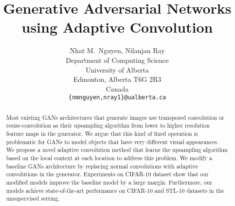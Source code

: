 \documentclass{article} %
\title{Generative Adversarial Networks using Adaptive Convolution}
\author{Nhat M.~Nguyen, Nilanjan Ray \\
Department of Computing Science\\
University of Alberta\\
Edmonton, Alberta T6G 2R3 \\
Canada \\
\texttt{\{nmnguyen,nray1\}@ualberta.ca}
}
\begin{document}
\maketitle

\begin{abstract}
Most existing GANs architectures that generate images use transposed convolution or resize-convolution as their upsampling algorithm from lower to higher resolution feature maps in the generator. We argue that this kind of fixed operation is problematic for GANs to model objects that have very different visual appearances. We propose a novel adaptive convolution method that learns the upsampling algorithm based on the local context at each location to address this problem. We modify a baseline GANs architecture by replacing normal convolutions with adaptive convolutions in the generator. Experiments on CIFAR-10 dataset show that our modified models improve the baseline model by a large margin. Furthermore, our models achieve state-of-the-art performance on CIFAR-10 and STL-10 datasets in the unsupervised setting.
\end{abstract}
\end{document}
